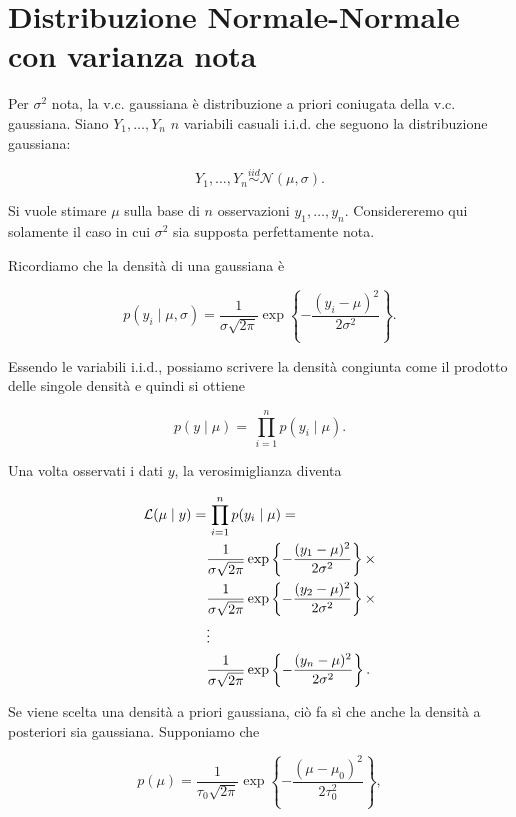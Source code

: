 \documentclass[
  11pt,
]{krantz}
\theoremstyle{definition}
\theoremstyle{definition}
\theoremstyle{definition}
\theoremstyle{definition}
\theoremstyle{remark}
\begin{document}
\hypertarget{distribuzione-normale-normale-con-varianza-nota}{%
\section{Distribuzione Normale-Normale con varianza nota}\label{distribuzione-normale-normale-con-varianza-nota}}

Per \(\sigma^2\) nota, la v.c. gaussiana è distribuzione a priori coniugata della v.c. gaussiana. Siano \(Y_1, \dots, Y_n\) \(n\) variabili casuali i.i.d. che seguono la distribuzione gaussiana:

\[
Y_1, \dots, Y_n  \stackrel{iid}{\sim} \mathcal{N}(\mu, \sigma).
\]

Si vuole stimare \(\mu\) sulla base di \(n\) osservazioni \(y_1, \dots, y_n\). Considereremo qui solamente il caso in cui \(\sigma^2\) sia supposta perfettamente nota.

Ricordiamo che la densità di una gaussiana è

\[
p(y_i \mid \mu, \sigma) = \frac{1}{{\sigma \sqrt {2\pi}}}\exp\left\{{-\frac{(y_i - \mu)^2}{2\sigma^2}}\right\}.
\]

Essendo le variabili i.i.d., possiamo scrivere la densità congiunta come il prodotto delle singole densità e quindi si ottiene

\[
p(y \mid \mu) = \, \prod_{i=1}^n p(y_i \mid \mu).
\]

Una volta osservati i dati \(y\), la verosimiglianza diventa

\begin{align}
\mathcal{L}(\mu \mid y) =& \, \prod_{i=1}^n p(y_i \mid \mu) = \notag\\
& \frac{1}{{\sigma \sqrt {2\pi}}}\exp\left\{{-\frac{(y_1 - \mu)^2}{2\sigma^2}}\right\} \times \notag\\
 & \frac{1}{{\sigma \sqrt {2\pi}}}\exp\left\{{-\frac{(y_2 - \mu)^2}{2\sigma^2}}\right\} \times  \notag\\
& \vdots \notag\\
 & \frac{1}{{\sigma \sqrt {2\pi}}}\exp\left\{{-\frac{(y_n - \mu)^2}{2\sigma^2}}\right\}.
\end{align}

Se viene scelta una densità a priori gaussiana, ciò fa sì che anche la densità a posteriori sia gaussiana. Supponiamo che

\begin{equation}
p(\mu) = \frac{1}{{\tau_0 \sqrt {2\pi}}}\exp\left\{{-\frac{(\mu - \mu_0)^2}{2\tau_0^2}}\right\},
\label{eq:prior-mu-norm-norm}
\end{equation}
\end{document}
